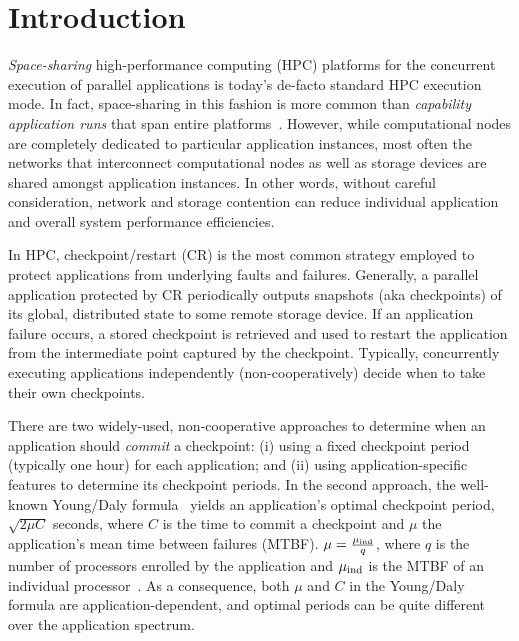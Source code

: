 \section{Introduction}
\label{sec:intro}


\emph{Space-sharing} high-performance computing (HPC) platforms for the concurrent
execution of parallel applications is today's de-facto standard HPC execution
mode. In fact, space-sharing in this fashion is more common than \emph{capability
  application runs} that span entire platforms~\cite{xx}. However, while
computational nodes are completely dedicated to particular application instances,
most often the networks that interconnect computational nodes as well as storage
devices are shared amongst application instances. In other words, without careful
consideration, network and storage contention can reduce individual application and
overall system performance efficiencies.

In HPC, checkpoint/restart (CR) is the most common strategy employed to protect
applications from underlying faults and failures. Generally, a parallel application
protected by CR periodically outputs snapshots (aka checkpoints) of its global,
distributed state to some remote storage device. If an application failure occurs, a
stored checkpoint is retrieved and used to restart the application from the
intermediate point captured by the checkpoint. Typically, concurrently executing
applications independently (non-cooperatively) decide when to take their own
checkpoints.

There are two widely-used, non-cooperative approaches to determine when an
application should \emph{commit} a checkpoint: (i) using a fixed checkpoint period
(typically one hour) for each application; and (ii) using application-specific
features to determine its checkpoint periods. In the second approach, the well-known
Young/Daly formula~\cite{young74,daly04} yields an application's optimal checkpoint
period, $\sqrt{2 \mu C}$ seconds, where $C$ is the time to commit a checkpoint and
$\mu$ the application's mean time between failures (MTBF). $\mu = \frac{\mu_{\text{ind}}}{q}$,
where $q$ is the number of processors enrolled by the application and $\mu_{\text{ind}}$ is the
MTBF of an individual processor~\cite{springer-monograph}. As a consequence, both
$\mu$ and $C$ in the Young/Daly formula are application-dependent, and optimal
periods can be quite different over the application spectrum.

